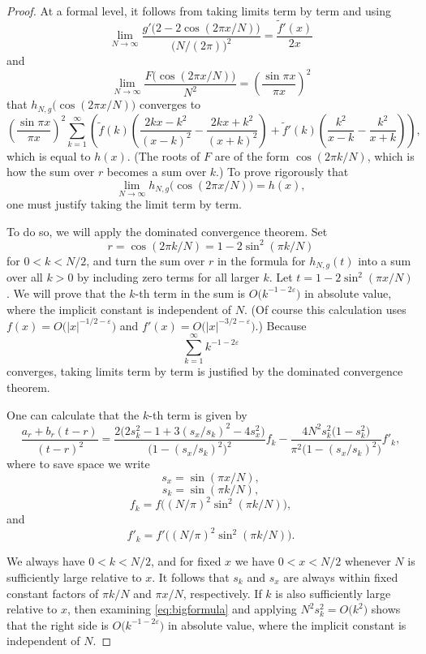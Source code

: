 \documentclass{jams-l}
\theoremstyle{plain}
\numberwithin{theorem}{section}
\theoremstyle{definition}
\numberwithin{equation}{section}
\newcommand{\ft}{\widetilde{f}}
\begin{document}
\begin{proof}
At a formal level, it follows from taking limits term by term and
using
$$
\lim_{N \to \infty} \frac{g'\big(2 - 2\cos (2\pi
x/N)\big)}{\big(N/(2\pi)\big)^2} = \frac{\ft'(x)}{2x}
$$
and
$$
\lim_{N \to \infty} \frac{F\big(\cos(2\pi x/N)\big)}{N^2} =
\left(\frac{\sin \pi x}{\pi x} \right)^2
$$
that $h_{N,g}\big(\cos (2\pi x/N)\big)$ converges to
$$
\left(\frac{\sin \pi x}{\pi x} \right)^2 \sum_{k = 1}^\infty
\left(\ft(k)\left(\frac{2kx-k^2}{(x-k)^2}-\frac{2kx+k^2}{(x+k)^2}\right)
+ \ft'(k)\left(\frac{k^2}{x-k}-\frac{k^2}{x+k}\right) \right),
$$
which is equal to $h(x)$.  (The roots of $F$ are of the form
$\cos(2\pi k/N)$, which is how the sum over $r$ becomes a sum over
$k$.) To prove rigorously that
$$
\lim_{N \to \infty} h_{N,g}\big(\cos (2\pi x/N)\big) = h(x),
$$
one must justify taking the limit term by term.

To do so, we will apply the dominated convergence theorem.  Set
$$
r = \cos(2\pi k/N) = 1-2\sin^2(\pi k/N)
$$
for $0 < k < N/2$, and turn the sum over $r$ in the formula for
$h_{N,g}(t)$ into a sum over all $k>0$ by including zero terms for
all larger $k$. Let $t = 1-2\sin^2(\pi x/N)$.  We will prove that
the $k$-th term in the sum is $O\big(k^{-1-2\varepsilon}\big)$ in
absolute value, where the implicit constant is independent of $N$.
(Of course this calculation uses $f(x) =
O\big(|x|^{-1/2-\varepsilon}\big)$ and $f'(x) =
O\big(|x|^{-3/2-\varepsilon}\big)$.)  Because
$$
\sum_{k=1}^\infty k^{-1-2\varepsilon}
$$
converges, taking limits term by term is justified by the
dominated convergence theorem.

One can calculate that the $k$-th term is given by
\begin{equation}\label{eq:bigformula}
\frac{a_r + b_r(t-r)}{(t-r)^2} =
\frac{2\big(2s_k^2-1+3(s_x/s_k)^2-4s_x^2\big)}{\big(1-(s_x/s_k)^2\big)^2}
f_k -\frac{4N^2
s_k^2\big(1-s_k^2\big)}{\pi^2\big(1-(s_x/s_k)^2\big)}f'_k,
\end{equation}
where to save space we write
$$
s_x = \sin(\pi x/N),
$$
$$
s_k = \sin(\pi k/N),
$$
$$
f_k = f\big((N/\pi)^2 \sin^2 (\pi k /N) \big),
$$
and
$$
f'_k = f'\big((N/\pi)^2 \sin^2 (\pi k /N) \big).
$$

We always have $0 < k < N/2$, and for fixed $x$ we have $0 < x <
N/2$ whenever $N$ is sufficiently large relative to $x$.  It
follows that $s_k$ and $s_x$ are always within fixed constant
factors of $\pi k/N$ and $\pi x/N$, respectively.  If $k$ is also
sufficiently large relative to $x$, then examining
\eqref{eq:bigformula} and applying $N^2 s_k^2 = O\big(k^2\big)$
shows that the right side is $O\big(k^{-1-2\varepsilon}\big)$ in
absolute value, where the implicit constant is independent of $N$.
\end{proof}
\end{document}
